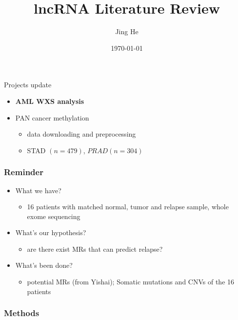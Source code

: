 \documentclass{beamer}
\title[Literature Review]{lncRNA Literature Review}
\author{Jing He}
\date{\today}
\begin{document}
\begin{frame}{}
\titlepage
\end{frame}
\begin{frame}{Projects update}
\begin{itemize}
	\item \textbf{AML WXS analysis}
	\item PAN cancer methylation 
	\begin{itemize}
		\item data downloading and preprocessing
		\item STAD $(n = 479)$, $PRAD(n = 304)$
	\end{itemize}
\end{itemize}
\end{frame}
\begin{frame}
\frametitle{Reminder}
\begin{itemize}
	\item What we have?
	\begin{itemize}
		\item 16 patients with matched normal, tumor and relapse sample,
			whole exome sequencing
	\end{itemize}	
	\item What's our hypothesis?
	\begin{itemize}
		\item are there exist MRs that can predict relapse?  
	\end{itemize}
	\item What's been done?
	\begin{itemize}
		\item potential MRs (from Yishai); 
		Somatic mutations and CNVs of the 16 patients  
	\end{itemize}
\end{itemize}
\end{frame}
\begin{frame}
\frametitle{Methods}


\end{frame}
\end{document}
